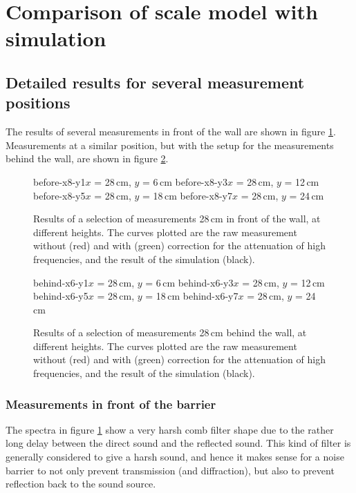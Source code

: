 \section{Comparison of scale model with simulation \label{sectComparison}}

\subsection{Detailed results for several measurement positions}
The results of several measurements in front of the wall are shown in figure \ref{beforePlots}. Measurements at a similar position, but with the setup for the measurements behind the wall, are shown in figure \ref{behindPlots}.


\begin{figure}
\figOctaveTwoNoFigNoCaption{-0.0cm}
	{before-x8-y1}{$x$ = 28\,cm, $y$ = 6\,cm}
	{before-x8-y3}{$x$ = 28\,cm, $y$ = 12\,cm}
\figOctaveTwoNoFigNoCaption{-0.0cm}
	{before-x8-y5}{$x$ = 28\,cm, $y$ = 18\,cm}
	{before-x8-y7}{$x$ = 28\,cm, $y$ = 24\,cm}
\caption{Results of a selection of measurements 28\,cm in front of the wall, at different heights. The curves plotted are the raw measurement without (red) and with (green) correction for the attenuation of high frequencies, and the result of the simulation (black). \label{beforePlots}}
\end{figure}

\begin{figure}
\figOctaveTwoNoFigNoCaption{-0.0cm}
	{behind-x6-y1}{$x$ = 28\,cm, $y$ = 6\,cm}
	{behind-x6-y3}{$x$ = 28\,cm, $y$ = 12\,cm}
\figOctaveTwoNoFigNoCaption{-0.0cm}
	{behind-x6-y5}{$x$ = 28\,cm, $y$ = 18\,cm}
	{behind-x6-y7}{$x$ = 28\,cm, $y$ = 24\,cm}
\caption{Results of a selection of measurements 28\,cm behind the wall, at different heights. The curves plotted are the raw measurement without (red) and with (green) correction for the attenuation of high frequencies, and the result of the simulation (black). \label{behindPlots}}
\end{figure}


\subsubsection*{Measurements in front of the barrier}

The spectra in figure \ref{beforePlots} show a very harsh comb filter shape due to the rather long delay between the direct sound and the reflected sound. This kind of filter is generally considered to give a harsh sound, and hence it makes sense for a noise barrier to not only prevent transmission (and diffraction), but also to prevent reflection back to the sound source.

